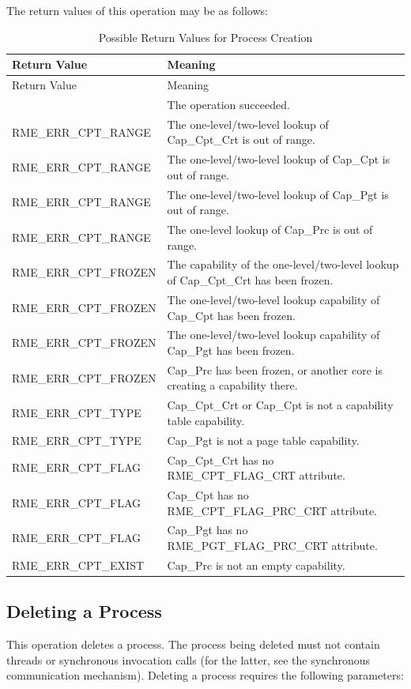 The return values of this operation may be as follows:

\begin{xltabular}{\textwidth}{@{}>{\hsize\raggedright\arraybackslash}X>{\hsize\raggedright\arraybackslash}X@{}}
\caption{Possible Return Values for Process Creation}\label{tab:4-11-create-process-return-values}\\
\toprule
Return Value & Meaning\tabularnewline
\endfirsthead
\toprule
Return Value & Meaning\tabularnewline
\midrule
\endhead
\bottomrule
{} & The operation succeeded.\tabularnewline
    RME\_ERR\_CPT\_RANGE & The one-level/two-level lookup of Cap\_Cpt\_Crt is out of range.\tabularnewline
    RME\_ERR\_CPT\_RANGE & The one-level/two-level lookup of Cap\_Cpt is out of range.\tabularnewline
    RME\_ERR\_CPT\_RANGE & The one-level/two-level lookup of Cap\_Pgt is out of range.\tabularnewline
    RME\_ERR\_CPT\_RANGE & The one-level lookup of Cap\_Prc is out of range.\tabularnewline
    RME\_ERR\_CPT\_FROZEN & The capability of the one-level/two-level lookup of Cap\_Cpt\_Crt has been frozen.\tabularnewline
    RME\_ERR\_CPT\_FROZEN & The one-level/two-level lookup capability of Cap\_Cpt has been frozen.\tabularnewline
    RME\_ERR\_CPT\_FROZEN & The one-level/two-level lookup capability of Cap\_Pgt has been frozen.\tabularnewline
    RME\_ERR\_CPT\_FROZEN & Cap\_Prc has been frozen, or another core is creating a capability there.\tabularnewline
    RME\_ERR\_CPT\_TYPE & Cap\_Cpt\_Crt or Cap\_Cpt is not a capability table capability.\tabularnewline
    RME\_ERR\_CPT\_TYPE & Cap\_Pgt is not a page table capability.\tabularnewline
    RME\_ERR\_CPT\_FLAG & Cap\_Cpt\_Crt has no RME\_CPT\_FLAG\_CRT attribute.\tabularnewline
    RME\_ERR\_CPT\_FLAG & Cap\_Cpt has no RME\_CPT\_FLAG\_PRC\_CRT attribute.\tabularnewline
    RME\_ERR\_CPT\_FLAG & Cap\_Pgt has no RME\_PGT\_FLAG\_PRC\_CRT attribute.\tabularnewline
    RME\_ERR\_CPT\_EXIST & Cap\_Prc is not an empty capability.\tabularnewline
\end{xltabular}
\nopagebreak[4]

\subsection{Deleting a Process}\label{subsec:4-delete-a-process}

This operation deletes a process. The process being deleted must not contain threads or synchronous invocation calls (for the latter, see the synchronous communication mechanism). Deleting a process requires the following parameters:


